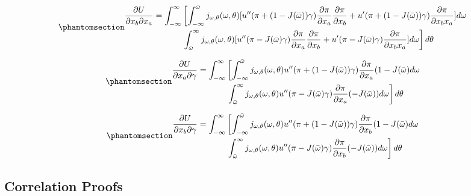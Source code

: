 \documentclass[
  letterpaper,
  DIV=11,
  numbers=noendperiod]{scrartcl}
\theoremstyle{plain}
\theoremstyle{plain}
\theoremstyle{remark}
\begin{document}
\begin{equation}\phantomsection\label{eq-crossk}{
\begin{aligned}
\frac{\partial U}{\partial x_b \partial x_a}=\int^\infty_{-\infty}&\left[ \int^{\bar \omega}_{-\infty}j_{\omega,\theta}(\omega,\theta)[u''(\pi+(1-J(\bar \omega))\gamma)\frac{\partial\pi}{\partial x_a}\frac{\partial \pi}{\partial x_b}+u'(\pi+(1-J(\bar \omega))\gamma)\frac{\partial \pi}{\partial x_b x_a}]d\omega \right. \\
& \left.\int^\infty_{\bar \omega}j_{\omega,\theta}(\omega,\theta)[u''(\pi-J(\bar \omega)\gamma)\frac{\partial\pi}{\partial x_a}\frac{\partial \pi}{\partial x_b}+u'(\pi-J(\bar \omega)\gamma)\frac{\partial \pi}{\partial x_b x_a}]d\omega\right]d\theta
\end{aligned}
}\end{equation}

\begin{equation}\phantomsection\label{eq-kgam}{
\begin{aligned}
\frac{\partial U}{\partial x_a \partial \gamma}=\int^\infty_{-\infty}&\left[ \int^{\bar \omega}_{-\infty}j_{\omega,\theta}(\omega,\theta)u''(\pi+(1-J(\bar \omega))\gamma)\frac{\partial\pi}{\partial x_a}(1-J(\bar \omega)d\omega \right. \\
& \left.\int^\infty_{\bar \omega}j_{\omega,\theta}(\omega,\theta)u''(\pi-J(\bar \omega)\gamma)\frac{\partial\pi}{\partial x_a}(-J(\bar \omega))d\omega\right]d\theta
\end{aligned}
}\end{equation}

\begin{equation}\phantomsection\label{eq-lgam}{
\begin{aligned}
\frac{\partial U}{\partial x_b \partial \gamma}=\int^\infty_{-\infty}&\left[ \int^{\bar \omega}_{-\infty}j_{\omega,\theta}(\omega,\theta)u''(\pi+(1-J(\bar \omega))\gamma)\frac{\partial\pi}{\partial x_b}(1-J(\bar \omega)d\omega \right. \\
&\left.\int^\infty_{\bar \omega}j_{\omega,\theta}(\omega,\theta)u''(\pi-J(\bar \omega)\gamma)\frac{\partial\pi}{\partial x_b}(-J(\bar \omega))d\omega\right]d\theta
\end{aligned}
}\end{equation}

\subsection{Correlation Proofs}\label{correlation-proofs}
\end{document}
